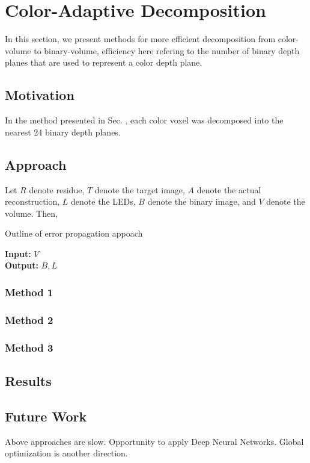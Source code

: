 \section{Color-Adaptive Decomposition}

In this section, we present methods for more efficient decomposition from color-volume to binary-volume, efficiency here refering to the number of binary depth planes that are used to represent a color depth plane. 

\subsection{Motivation}
In the method presented in Sec. , each color voxel was decomposed into the nearest 24 binary depth planes. 

\subsection{Approach}


\begin{algorithm}
\end{algorithm}
Let $R$ denote residue, $T$ denote the target image, $A$ denote the actual reconstruction, $L$ denote the LEDs, $B$ denote the binary image, and $V$ denote the volume. Then, 

\begin{algorithm}
    \caption{Outline of error propagation appoach}
    \label{alg:colorAdaptiveMethodOne}
    \hspace*{\algorithmicindent}\textbf{Input:} $V$\\
    \hspace*{\algorithmicindent}\textbf{Output:} $B, L$
    \begin{algorithmic}[1]
        \ENDFOR
    \end{algorithmic}
\end{algorithm}

\subsubsection{Method 1}

\subsubsection{Method 2}

\subsubsection{Method 3}

\subsection{Results}

\subsection{Future Work}
Above approaches are slow. Opportunity to apply Deep Neural Networks. Global optimization is another direction.
